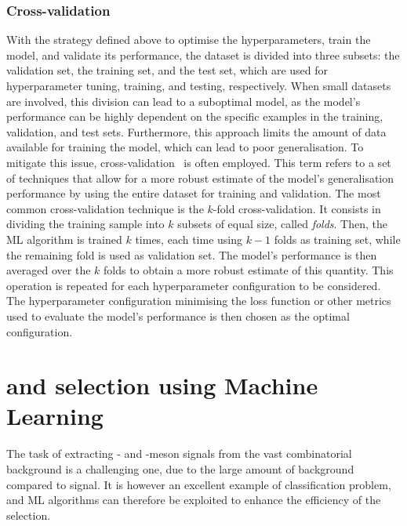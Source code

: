 \subsubsection{Cross-validation}

With the strategy defined above to optimise the hyperparameters, train the model, and validate its performance, the dataset is divided into three subsets: the validation set, the training set,  and the test set, which are used for hyperparameter tuning, training, and testing, respectively. When small datasets are involved, this division can lead to a suboptimal model, as the model's performance can be highly dependent on the specific examples in the training, validation, and test sets. Furthermore, this approach limits the amount of data available for training the model, which can lead to poor generalisation. To mitigate this issue, cross-validation~\cite{stone1974cross} is often employed. This term refers to a set of techniques that allow for a more robust estimate of the model's generalisation performance by using the entire dataset for training and validation. The most common cross-validation technique is the $k$-fold cross-validation. It consists in dividing the training sample into $k$ subsets of equal size, called \emph{folds}. Then, the ML algorithm is trained $k$ times, each time using $k-1$ folds as training set, while the remaining fold is used as validation set. The model's performance is then averaged over the $k$ folds to obtain a more robust estimate of this quantity. This operation is repeated for each hyperparameter configuration to be considered. The hyperparameter configuration minimising the loss function or other metrics used to evaluate the model's performance is then chosen as the optimal configuration.

\section{\texorpdfstring{\ds and \dpl selection using Machine Learning}{Ds+ and D+ selection using Machine Learning}}

The task of extracting \ds- and \dpl-meson signals from the vast combinatorial background is a challenging one, due to the large amount of background compared to signal. It is however an excellent example of classification problem, and ML algorithms can therefore be exploited to enhance the efficiency of the selection. 

